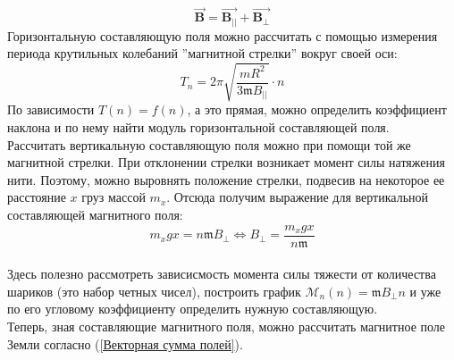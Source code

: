 \documentclass[a4paper, 12pt]{article}
\begin{document}
\begin{enumerate}
\begin{equation}
        \vec{\mathbf{B}} = \vec{\mathbf{B_{||}}} + \vec{\mathbf{B_{\perp}}}
        \label{Векторная сумма полей}
    \end{equation}
    Горизонтальную составляющую поля можно рассчитать с помощью измерения периода крутильных колебаний ''магнитной стрелки'' вокруг своей оси:
    \begin{equation}
        T_{n} = 2\pi \sqrt{\frac{mR^{2}}{3\mathfrak{m}B_{||}}}\cdot n
        \label{Период крутильных колебаний}
    \end{equation}
    По зависимости $T(n) = f(n)$, а это прямая, можно определить коэффициент наклона и по нему найти модуль горизонтальной составляющей поля.\\
    Рассчитать вертикальную составляющую поля можно при помощи той же магнитной стрелки. При отклонении стрелки возникает момент силы натяжения нити. Поэтому, можно выровнять положение стрелки, подвесив на некоторое ее расстояние $x$ груз массой $m_{x}$. Отсюда получим выражение для вертикальной составляющей магнитного поля:
    \begin{equation}
        m_{x}gx = n\mathfrak{m}B_{\perp} \iff B_{\perp} = \frac{m_{x}gx}{n\mathfrak{m}}
        \label{Вертикальная составляющая}
    \end{equation}\\
    Здесь полезно рассмотреть зависисмость момента силы тяжести от количества шариков (это набор четных чисел), построить график $\mathcal{M}_{n}(n) = \mathfrak{m} B_{\perp}n$ и уже по его угловому коэффициенту определить нужную составляющую.\\
    Теперь, зная составляющие магнитного поля, можно рассчитать магнитное поле Земли согласно (\ref{Векторная сумма полей}).
\end{enumerate}
\end{document}
